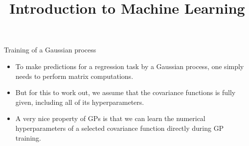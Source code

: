 




\newcommand{\titlefigure}{figure_man/training/fit-vs-penalty.pdf} %
\newcommand{\learninggoals}{
  \item Training of GPs via Maximum Likelihood estimation of its hyperparameters
  \item Computational complexity is governed by matrix inversion of the covariance matrix
}

\title{Introduction to Machine Learning}
\date{}





\begin{vbframe}{Training of a Gaussian process}

\begin{itemize}
\item To make predictions for a regression task by a Gaussian process, one simply needs to perform matrix computations.
\vspace{.5cm}
\item But for this to work out, we assume that the covariance functions is fully given, including all of its hyperparameters.
\vspace{.5cm}
\item A very nice property of GPs is that we can learn the numerical hyperparameters of a selected covariance function directly during GP training.
\end{itemize}

\end{vbframe}


